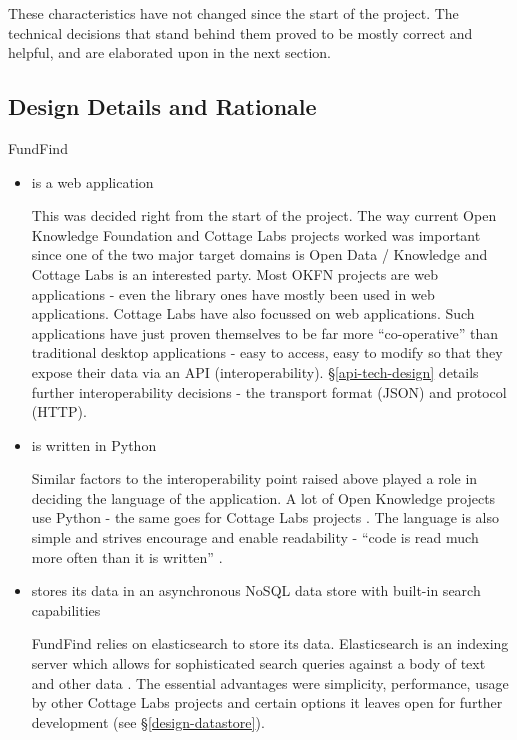 These characteristics have not changed since the start of the project. The technical decisions that stand behind them proved to be mostly correct and helpful, and are elaborated upon in the next section.

\subsection{Design Details and Rationale}
\label{design-rationale}

FundFind
\begin{itemize}
 \item is a web application
 
This was decided right from the start of the project. The way current Open Knowledge Foundation and Cottage Labs projects worked was important since one of the two major target domains is Open Data / Knowledge and Cottage Labs is an interested party. Most OKFN projects are web applications - even the library ones have mostly been used in web applications. Cottage Labs have also focussed on web applications. Such applications have just proven themselves to be far more ``co-operative'' than traditional desktop applications - easy to access, easy to modify so that they expose their data via an API (interoperability). \S\ref{api-tech-design} details further interoperability decisions - the transport format (JSON) and protocol (HTTP).
 
 \item is written in Python

Similar factors to the interoperability point raised above played a role in deciding the language of the application. A lot of Open Knowledge projects use Python \cite{nomenklatura, offenesparlament, pybossa, activityapi} - the same goes for Cottage Labs projects \cite{leaps, portality, iioa, artemis, cl-web-code, xcri, negotiator}. The language is also simple and strives encourage and enable readability - ``code is read much more often than it is written'' \cite{pep8}.
 
 \item stores its data in an asynchronous NoSQL data store with built-in search capabilities
 
 FundFind relies on elasticsearch to store its data. Elasticsearch is an indexing server which allows for sophisticated search queries against a body of text and other data \cite{es}. The essential advantages were simplicity, performance, usage by other Cottage Labs projects and certain options it leaves open for further development (see \S\ref{design-datastore}).
 

\end{itemize}
